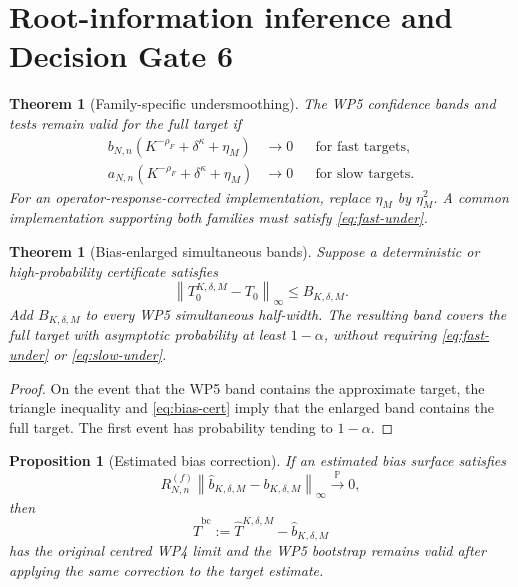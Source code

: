 \documentclass[11pt]{article}
\newtheorem{proposition}[assumption]{Proposition}
\newtheorem{theorem}[assumption]{Theorem}
\theoremstyle{remark}
\newcommand{\Pp}{\mathbb P}
\newcommand{\norm}[1]{\left\lVert #1\right\rVert}
\newcommand{\an}{a_{N,n}}
\newcommand{\bn}{b_{N,n}}
\begin{document}
\section{Root-information inference and Decision Gate 6}

\begin{theorem}[Family-specific undersmoothing]\label{thm:undersmoothing}
The WP5 confidence bands and tests remain valid for the full target if
\begin{align}
 \bn\left(K^{-\rho_F}+\delta^\kappa+\eta_M\right)&\to0
 &&\text{for fast targets},
 \label{eq:fast-under}\\
 \an\left(K^{-\rho_F}+\delta^\kappa+\eta_M\right)&\to0
 &&\text{for slow targets}.
 \label{eq:slow-under}
\end{align}
For an operator-response-corrected implementation, replace $\eta_M$ by $\eta_M^2$. A common implementation supporting both families must satisfy \eqref{eq:fast-under}.
\end{theorem}

\begin{theorem}[Bias-enlarged simultaneous bands]\label{thm:bias-bands}
Suppose a deterministic or high-probability certificate satisfies
\begin{equation}\label{eq:bias-cert}
 \norm{T_0^{K,\delta,M}-T_0}_\infty\le B_{K,\delta,M}.
\end{equation}
Add $B_{K,\delta,M}$ to every WP5 simultaneous half-width. The resulting band covers the full target with asymptotic probability at least $1-\alpha$, without requiring \eqref{eq:fast-under} or \eqref{eq:slow-under}.
\end{theorem}

\begin{proof}
On the event that the WP5 band contains the approximate target, the triangle inequality and \eqref{eq:bias-cert} imply that the enlarged band contains the full target. The first event has probability tending to $1-\alpha$.
\end{proof}

\begin{proposition}[Estimated bias correction]\label{prop:bias-correction}
If an estimated bias surface satisfies
\begin{equation}\label{eq:bias-est}
 R_{N,n}^{(f)}
 \norm{\widehat b_{K,\delta,M}-b_{K,\delta,M}}_\infty
 \overset{\Pp}{\longrightarrow}0,
\end{equation}
then
\begin{equation}\label{eq:bc-est}
 \widehat T^{\mathrm{bc}}
 :=\widehat T^{K,\delta,M}-\widehat b_{K,\delta,M}
\end{equation}
has the original centred WP4 limit and the WP5 bootstrap remains valid after applying the same correction to the target estimate.
\end{proposition}
\end{document}
